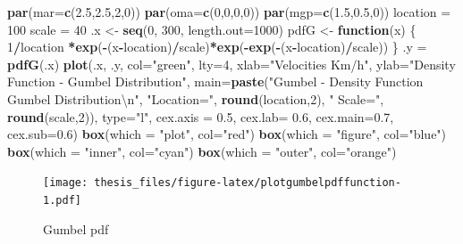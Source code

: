 \documentclass[12pt,oneside]{reedthesis}
\newenvironment{Shaded}{\begin{snugshade}}{\end{snugshade}}
\newcommand{\CharTok}[1]{\textcolor[rgb]{0.31,0.60,0.02}{#1}}
\newcommand{\ControlFlowTok}[1]{\textcolor[rgb]{0.13,0.29,0.53}{\textbf{#1}}}
\newcommand{\DataTypeTok}[1]{\textcolor[rgb]{0.13,0.29,0.53}{#1}}
\newcommand{\DecValTok}[1]{\textcolor[rgb]{0.00,0.00,0.81}{#1}}
\newcommand{\FloatTok}[1]{\textcolor[rgb]{0.00,0.00,0.81}{#1}}
\newcommand{\KeywordTok}[1]{\textcolor[rgb]{0.13,0.29,0.53}{\textbf{#1}}}
\newcommand{\NormalTok}[1]{#1}
\newcommand{\OperatorTok}[1]{\textcolor[rgb]{0.81,0.36,0.00}{\textbf{#1}}}
\newcommand{\StringTok}[1]{\textcolor[rgb]{0.31,0.60,0.02}{#1}}
\begin{document}
\footnotesize
\begin{Shaded}
\begin{Highlighting}[]
\KeywordTok{par}\NormalTok{(}\DataTypeTok{mar=}\KeywordTok{c}\NormalTok{(}\FloatTok{2.5}\NormalTok{,}\FloatTok{2.5}\NormalTok{,}\DecValTok{2}\NormalTok{,}\DecValTok{0}\NormalTok{))}
\KeywordTok{par}\NormalTok{(}\DataTypeTok{oma=}\KeywordTok{c}\NormalTok{(}\DecValTok{0}\NormalTok{,}\DecValTok{0}\NormalTok{,}\DecValTok{0}\NormalTok{,}\DecValTok{0}\NormalTok{))}
\KeywordTok{par}\NormalTok{(}\DataTypeTok{mgp=}\KeywordTok{c}\NormalTok{(}\FloatTok{1.5}\NormalTok{,}\FloatTok{0.5}\NormalTok{,}\DecValTok{0}\NormalTok{))}
\NormalTok{location =}\StringTok{ }\DecValTok{100}
\NormalTok{scale =}\StringTok{ }\DecValTok{40}
\NormalTok{.x <-}\StringTok{ }\KeywordTok{seq}\NormalTok{(}\DecValTok{0}\NormalTok{, }\DecValTok{300}\NormalTok{, }\DataTypeTok{length.out=}\DecValTok{1000}\NormalTok{)}
\NormalTok{pdfG <-}\StringTok{ }\ControlFlowTok{function}\NormalTok{(x) \{}
  \DecValTok{1}\OperatorTok{/}\NormalTok{location }\OperatorTok{*}\KeywordTok{exp}\NormalTok{(}\OperatorTok{-}\NormalTok{(x}\OperatorTok{-}\NormalTok{location)}\OperatorTok{/}\NormalTok{scale)}\OperatorTok{*}\KeywordTok{exp}\NormalTok{(}\OperatorTok{-}\KeywordTok{exp}\NormalTok{(}\OperatorTok{-}\NormalTok{(x}\OperatorTok{-}\NormalTok{location)}\OperatorTok{/}\NormalTok{scale))}
\NormalTok{  \}}
\NormalTok{.y =}\StringTok{ }\KeywordTok{pdfG}\NormalTok{(.x)}
\KeywordTok{plot}\NormalTok{(.x, .y, }\DataTypeTok{col=}\StringTok{"green"}\NormalTok{, }\DataTypeTok{lty=}\DecValTok{4}\NormalTok{, }
     \DataTypeTok{xlab=}\StringTok{"Velocities Km/h"}\NormalTok{, }\DataTypeTok{ylab=}\StringTok{"Density Function - Gumbel Distribution"}\NormalTok{, }
     \DataTypeTok{main=}\KeywordTok{paste}\NormalTok{(}\StringTok{"Gumbel - Density Function Gumbel Distribution}\CharTok{\textbackslash{}n}\StringTok{"}\NormalTok{, }\StringTok{"Location="}\NormalTok{, }
     \KeywordTok{round}\NormalTok{(location,}\DecValTok{2}\NormalTok{), }\StringTok{" Scale="}\NormalTok{, }\KeywordTok{round}\NormalTok{(scale,}\DecValTok{2}\NormalTok{)), }\DataTypeTok{type=}\StringTok{"l"}\NormalTok{, }
     \DataTypeTok{cex.axis =} \FloatTok{0.5}\NormalTok{, }\DataTypeTok{cex.lab=} \FloatTok{0.6}\NormalTok{, }\DataTypeTok{cex.main=}\FloatTok{0.7}\NormalTok{, }\DataTypeTok{cex.sub=}\FloatTok{0.6}\NormalTok{)}
\KeywordTok{box}\NormalTok{(}\DataTypeTok{which =} \StringTok{"plot"}\NormalTok{, }\DataTypeTok{col=}\StringTok{"red"}\NormalTok{)}
\KeywordTok{box}\NormalTok{(}\DataTypeTok{which =} \StringTok{"figure"}\NormalTok{, }\DataTypeTok{col=}\StringTok{"blue"}\NormalTok{)}
\KeywordTok{box}\NormalTok{(}\DataTypeTok{which =} \StringTok{"inner"}\NormalTok{, }\DataTypeTok{col=}\StringTok{"cyan"}\NormalTok{)}
\KeywordTok{box}\NormalTok{(}\DataTypeTok{which =} \StringTok{"outer"}\NormalTok{, }\DataTypeTok{col=}\StringTok{"orange"}\NormalTok{)}
\end{Highlighting}
\end{Shaded}
\begin{figure}
\centering
\texttt{[image: thesis\_files/figure-latex/plotgumbelpdffunction-1.pdf]}
\caption{\label{fig:plotgumbelpdffunction}Gumbel pdf}
\end{figure}
\normalsize
\end{document}
